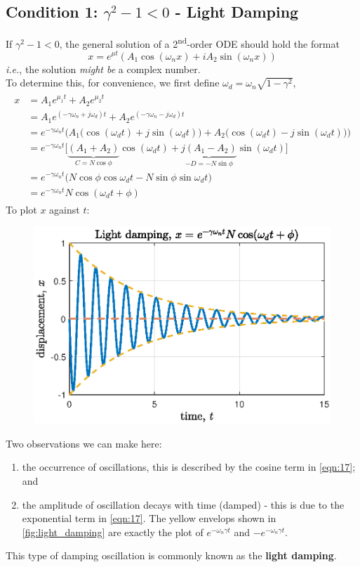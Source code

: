 \documentclass[12pt,a4paper]{article}
\begin{document}
\subsection{Condition 1: $\gamma^{2}-1<0$ - Light Damping}
If $\gamma^{2}-1<0$, the general solution of a 2\textsuperscript{nd}-order ODE should hold the format 
\[
    x = e^{\mu t} (A_1 \cos(\omega_n x) + iA_2\sin(\omega_n x))
\]
\textit{i.e.}, the solution \textit{might be} a complex number.\\

To determine this, for convenience, we first define $\omega_{d}=\omega_{n}\sqrt{1-\gamma^{2}}$,
\begin{align}
\begin{split} \label{eqn:17}
x &= A_{1}e^{\mu_{1}t} + A_{2}e^{\mu_{2}t} \\
& = A_{1}e^{(-\gamma \omega_{n}+j\omega_{d})t}  +A_{2}e^{(-\gamma \omega_{n}-j\omega_{d})t}\\
&= e^{-\gamma \omega_{n} t}\bigg(A_{1}\big(\cos(\omega_{d}t)+j\sin(\omega_{d}t)\big)+A_{2}\big(\cos(\omega_{d}t)-j\sin(\omega_{d}t)\big)\bigg)\\
&= e^{-\gamma \omega_{n} t}\bigg[ \underbrace{(A_{1}+A_{2})}_{C= N\cos\phi}\cos(\omega_{d}t) + \underbrace{j(A_{1}-A_{2})}_{-D=-N\sin \phi}\sin(\omega_{d}t)\bigg]\\
&= e^{-\gamma \omega_{n} t} \big( N\cos\phi \cos\omega_{d}t - N\sin\phi \sin\omega_{d}t \big)\\
& = \boxed{e^{-\gamma \omega_{n} t} N \cos(\omega_{d}t+\phi)}
\end{split}
\end{align}
To plot $x$ against $t$:
\begin{figure}[H]
    \centering
    \includegraphics[width=.7\textwidth]{light_damping.eps}
    \label{fig:light_damping}
\end{figure}

Two observations we can make here:
\begin{enumerate}
    \item the occurrence of oscillations, this is described by the cosine term in \autoref{eqn:17}; and

    \item the amplitude of oscillation decays with time (damped) - this is due to the exponential term in \autoref{eqn:17}. The yellow envelops shown in \autoref{fig:light_damping} are exactly the plot of $e^{-\omega_{n}\gamma t}$ and $-e^{-\omega_{n}\gamma t}$.
\end{enumerate}
This type of damping oscillation is commonly known as the \textbf{light damping}.
\end{document}
